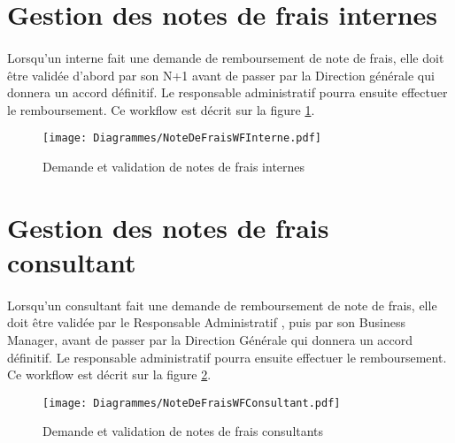 \section{Gestion des notes de frais internes}

\paragraph{} Lorsqu'un interne fait une demande de remboursement de note de frais, elle doit être validée d'abord par son N+1 avant de passer par la Direction générale qui donnera un accord définitif. Le responsable administratif pourra ensuite effectuer le remboursement. Ce workflow est décrit sur la figure \ref{ndfI}.


\begin{figure}[H]
	\centering
	\texttt{[image: Diagrammes/NoteDeFraisWFInterne.pdf]}
	\caption{Demande et validation de notes de frais internes} 
	\label{ndfI}
\end{figure}

\section{Gestion des notes de frais consultant}

\paragraph{} Lorsqu'un consultant fait une demande de remboursement de note de frais, elle doit être validée par le Responsable Administratif , puis par son Business Manager, avant de passer par la Direction Générale qui donnera un accord définitif. Le responsable administratif pourra ensuite effectuer le remboursement. Ce workflow est décrit sur la figure \ref{ndfC}.

\begin{figure}[H]
	\centering
	\texttt{[image: Diagrammes/NoteDeFraisWFConsultant.pdf]}
	\caption{Demande et validation de notes de frais consultants}
	\label{ndfC}
\end{figure}
